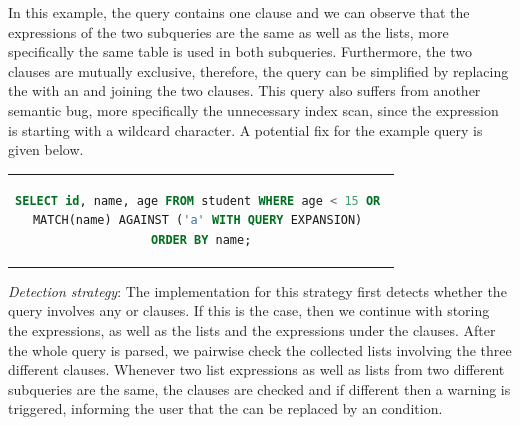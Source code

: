 In this example, the query contains one  clause and we can observe that the  expressions of the two subqueries are the same as well as the  lists, more specifically the same table  is used in both subqueries. Furthermore, the two  clauses are mutually exclusive, therefore, the query can be simplified by replacing the  with an  and joining the two  clauses. This query also suffers from another semantic bug, more specifically the unnecessary index scan, since the  expression is starting with a wildcard character. A potential fix for the example query is given below.

\begin{center}
\begin{tabular}{c}
\begin{lstlisting}[language=SQL]
SELECT id, name, age FROM student WHERE age < 15 OR 
MATCH(name) AGAINST ('a' WITH QUERY EXPANSION) 
ORDER BY name;
\end{lstlisting}
\end{tabular}
\end{center}

\noindent \emph{Detection strategy}: The implementation for this strategy first detects whether the query involves any  or  clauses. If this is the case, then we continue  with storing the  expressions, as well as the  lists and the expressions under the  clauses. After the whole query is parsed, we pairwise check the collected lists involving the three different clauses. Whenever two  list expressions as well as  lists from two different subqueries are the same, the  clauses are checked and if different then a warning is triggered, informing the user that the  can be replaced by an  condition.


